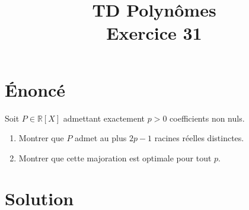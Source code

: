 \documentclass[french]{article}
\title{TD Polynômes \\ Exercice 31}
\date{}
\newcommand{\R}{\mathbb{R}}
\begin{document}
\maketitle

\section{Énoncé}
Soit $P\in\R[X]$ admettant exactement $p>0$ coefficients non nuls.
\begin{enumerate}
	\item Montrer que $P$ admet au plus $2p-1$ racines réelles distinctes.
	\item Montrer que cette majoration est optimale pour tout $p$.
\end{enumerate}
\section{Solution}
\end{document}
